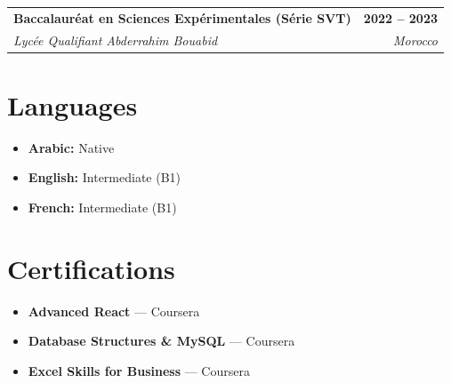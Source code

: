 \documentclass[a4paper,10pt]{article}
\makeatletter
\newcommand{\educationHeader}[4]{
  \noindent
  \begin{tabularx}{\textwidth}{@{}X r@{}}
    \textbf{\color{primary} #1} & \textbf{\color{textdark}\small #2} \\
    \textit{\small\color{textgray} #3} & \textit{\small\color{textgray} #4} \\
  \end{tabularx}
  \vspace{-3pt}
}
\makeatother
\begin{document}
\vspace{2pt}

\educationHeader{Baccalauréat en Sciences Expérimentales (Série SVT)}{2022 -- 2023}{Lycée Qualifiant Abderrahim Bouabid}{Morocco}

\begin{minipage}[t]{0.48\textwidth}
    \section{Languages}
    \begin{itemize}[label=\small\color{accent}\faLanguage]
        \item \textbf{Arabic:} Native
        \item \textbf{English:} Intermediate (B1)
        \item \textbf{French:} Intermediate (B1)
    \end{itemize}
\end{minipage}%
\hfill
\begin{minipage}[t]{0.48\textwidth}
    \section{Certifications}
    \begin{itemize}
        \item \textbf{Advanced React} --- Coursera
        \item \textbf{Database Structures \& MySQL} --- Coursera
        \item \textbf{Excel Skills for Business} --- Coursera
    \end{itemize}
\end{minipage}
\end{document}
